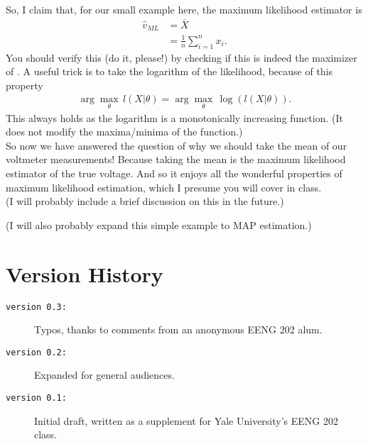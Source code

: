 \documentclass[10pt,letterpaper]{article}
\begin{document}
So, I claim that, for our small example here, the maximum likelihood estimator is
\begin{align}
	\widehat{v}_{ML} &= \overline{X}\\
					 &= \frac{1}{n}\sum_{i=1}^n x_i.
\end{align}
You should verify this (\textsf{do it, please!}) by checking if this is indeed the maximizer of . A useful trick is to take the logarithm of the likelihood, because of this property
\begin{align}
	\arg \max_\theta\, l(X\vert\theta) = \arg \max_\theta\, \log\left(l(X\vert\theta)\right).
\end{align}
This always holds as the logarithm is a monotonically increasing function. (It does not modify the maxima/minima of the function.)\\

So now we have answered the question of why we should take the mean of our voltmeter measurements! Because taking the mean is the maximum likelihood estimator of the true voltage. And so it enjoys all the wonderful properties of maximum likelihood estimation, which I presume you will cover in class.\\ 

(\textsf{I will probably include a brief discussion on this in the future.})

(\textsf{I will also probably expand this simple example to MAP estimation.})

\section{Version History}
\begin{description}
	\item[\texttt{version 0.3:}] Typos, thanks to comments from an anonymous EENG 202 alum.
	\item[\texttt{version 0.2:}] Expanded for general audiences.
	\item[\texttt{version 0.1:}] Initial draft, written as a supplement for Yale University's EENG 202 class.
\end{description}
\end{document}
